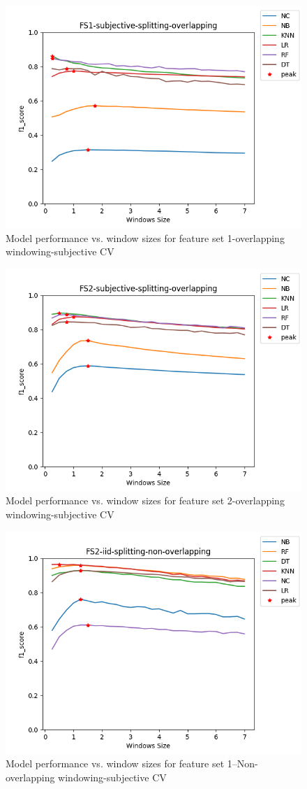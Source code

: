 
\begin{figure}[h]
    \centering
    \includegraphics[width=.5\textwidth]{Figures/FS1-subjective-splitting-overlapping.png}
    \caption{Model performance vs. window sizes for feature set 1-overlapping windowing-subjective CV}
    \label{fig:sbj-over-fs1}
\end{figure}

\begin{figure}[h]
    \centering
    \includegraphics[width=.5\textwidth]{Figures/FS2-subjective-splitting-overlapping.png}
    \caption{Model performance vs. window sizes for feature set 2-overlapping windowing-subjective CV}
    \label{fig:sbj-nonover-fs2}
\end{figure}








\begin{figure}[h]
    \centering
    \includegraphics[width=.5\textwidth]{Figures/FS2-iid-splitting-non-overlapping.png}
    \caption{Model performance vs. window sizes for feature set 1--Non-overlapping windowing-subjective CV}
    \label{fig:sbj-nonover-fs1}
\end{figure}





